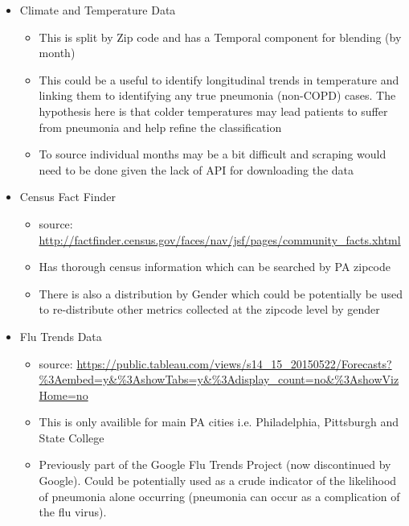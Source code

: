 \documentclass{article}
\begin{document}
\begin{itemize}
  \item Climate and Temperature Data
  \begin{itemize}
    \item This is split by Zip code and has a Temporal component for blending (by month)
    \item This could be a useful to identify longitudinal trends in temperature
          and linking them to identifying any true pneumonia (non-COPD) cases. The 
          hypothesis here is that colder temperatures may lead patients to 
          suffer from pneumonia and help refine the classification
    \item To source individual months may be a bit difficult and scraping 
          would need to be done given the lack of API for downloading the data
  \end{itemize}
  \item Census Fact Finder
  \begin{itemize}
    \item source: \url{http://factfinder.census.gov/faces/nav/jsf/pages/community_facts.xhtml}
    \item Has thorough census information which can be searched by PA zipcode
    \item There is also a distribution by Gender which could be potentially be 
          used to re-distribute other metrics collected at the zipcode level by 
          gender
  \end{itemize}
  \item Flu Trends Data
  \begin{itemize}
    \item source: \url{https://public.tableau.com/views/s14_15_20150522/Forecasts?%3Aembed=y&%3AshowTabs=y&%3Adisplay_count=no&%3AshowVizHome=no}
    \item This is only availible for main PA cities i.e. Philadelphia, 
          Pittsburgh and State College
    \item Previously part of the Google Flu Trends Project (now discontinued by 
          Google). Could be potentially used as a crude indicator of the 
          likelihood of pneumonia alone occurring (pneumonia can occur as 
          a complication of the flu virus).
  \end{itemize}
\end{itemize}



\end{document}
